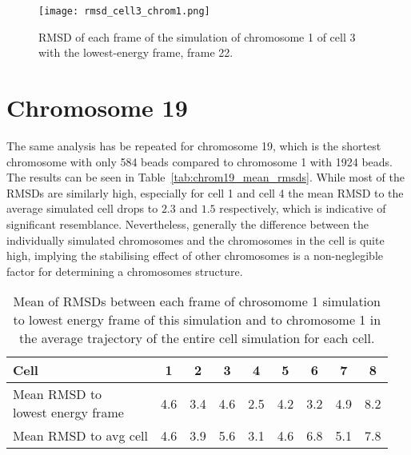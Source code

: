 \begin{figure}[ht]
\centering
	\texttt{[image: rmsd\_cell3\_chrom1.png]}
	\caption{RMSD of each frame of the simulation of chromosome 1 of cell 3 with the lowest-energy frame, frame 22.}
	\label{fig:rmsd_cell3_chrom1}
\end{figure}



\section{Chromosome 19} %
\label{sec:chromosome_19}

The same analysis has be repeated for chromosome 19, which is the shortest chromosome with only 584 beads compared to chromosome 1 with 1924 beads. The results can be seen in Table~\ref{tab:chrom19_mean_rmsds}. While most of the RMSDs are similarly high, especially for cell 1 and cell 4 the mean RMSD to the average simulated cell drops to \(2.3\) and \(1.5\) respectively, which is indicative of significant resemblance. Nevertheless, generally the difference between the individually simulated chromosomes and the chromosomes in the cell is quite high, implying the stabilising effect of other chromosomes is a non-neglegible factor for determining a chromosomes structure.

\begin{table}[ht]
\centering
  \caption{Mean of RMSDs between each frame of chrosomome 1 simulation to lowest energy frame of this simulation and to chromosome 1 in the average trajectory of the entire cell simulation for each cell.}
  \label{tab:chrom1_mean_rmsds}
  \begin{tabular}{l @{\phantom{abc}} S S S S S S S S}
  \toprule
    Cell & 1 & 2 & 3 & 4 & 5 & 6 & 7 & 8 \\
  \midrule
    \parbox{4cm}{Mean RMSD to \\ lowest energy frame} & 4.6 & 3.4 & 4.6 & 2.5 & 4.2 & 3.2 & 4.9 & 8.2 \\
    Mean RMSD to avg cell & 4.6 & 3.9 & 5.6 & 3.1 & 4.6 & 6.8 & 5.1 & 7.8 \\
  \bottomrule
  \end{tabular}
\end{table}

